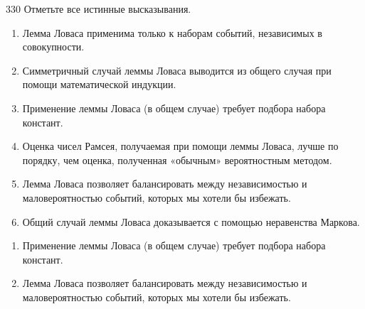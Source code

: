 \begin{task}{330}
Отметьте все истинные высказывания.
\begin{enumerate}
\item Лемма Ловаса применима только к наборам событий, независимых в совокупности.
\item Симметричный случай леммы Ловаса выводится из общего случая при помощи математической индукции.
\item Применение леммы Ловаса (в общем случае) требует подбора набора констант.
\item Оценка чисел Рамсея, получаемая при помощи леммы Ловаса, лучше по порядку, чем оценка, полученная «обычным» вероятностным методом.
\item Лемма Ловаса позволяет балансировать между независимостью и маловероятностью событий, которых мы хотели бы избежать.
\item Общий случай леммы Ловаса доказывается с помощью неравенства Маркова.
\end{enumerate}
\end{task}

\begin{solution}
\begin{enumerate}
\item Применение леммы Ловаса (в общем случае) требует подбора набора констант.
\item Лемма Ловаса позволяет балансировать между независимостью и маловероятностью событий, которых мы хотели бы избежать.
\end{enumerate}
\end{solution}
